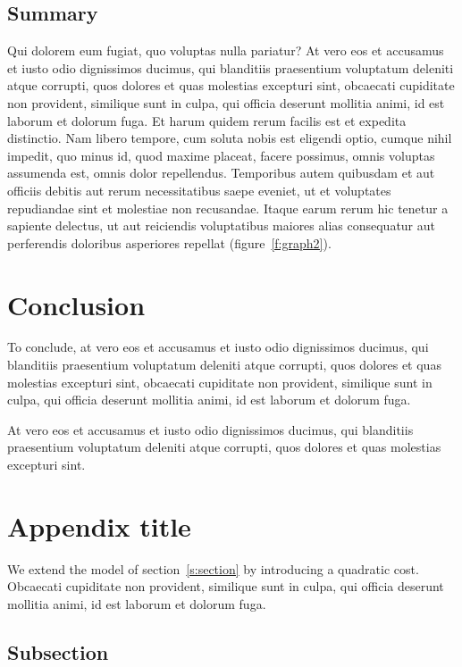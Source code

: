 \documentclass[letterpaper,12pt,leqno]{article}
\newcommand{\bib}{bibliography.bib}
\begin{document}
\subsection{Summary}

Qui dolorem eum fugiat, quo voluptas nulla pariatur? At vero eos et accusamus et iusto odio dignissimos ducimus, qui blanditiis praesentium voluptatum deleniti atque corrupti, quos dolores et quas molestias excepturi sint, obcaecati cupiditate non provident, similique sunt in culpa, qui officia deserunt mollitia animi, id est laborum et dolorum fuga. Et harum quidem rerum facilis est et expedita distinctio. Nam libero tempore, cum soluta nobis est eligendi optio, cumque nihil impedit, quo minus id, quod maxime placeat, facere possimus, omnis voluptas assumenda est, omnis dolor repellendus. Temporibus autem quibusdam et aut officiis debitis aut rerum necessitatibus saepe eveniet, ut et voluptates repudiandae sint et molestiae non recusandae. Itaque earum rerum hic tenetur a sapiente delectus, ut aut reiciendis voluptatibus maiores alias consequatur aut perferendis doloribus asperiores repellat (figure~\ref{f:graph2}).

\section{Conclusion}\label{s:ccl}

To conclude, at vero eos et accusamus et iusto odio dignissimos ducimus, qui blanditiis praesentium voluptatum deleniti atque corrupti, quos dolores et quas molestias excepturi sint, obcaecati cupiditate non provident, similique sunt in culpa, qui officia deserunt mollitia animi, id est laborum et dolorum fuga. 

At vero eos et accusamus et iusto odio dignissimos ducimus, qui blanditiis praesentium voluptatum deleniti atque corrupti, quos dolores et quas molestias excepturi sint.



\newpage
\appendix
\section{Appendix title}\label{a:appendix1}

We extend the model of section~\ref{s:section} by introducing a quadratic cost. Obcaecati cupiditate non provident, similique sunt in culpa, qui officia deserunt mollitia animi, id est laborum et dolorum fuga. 

\subsection{Subsection} 
\end{document}
